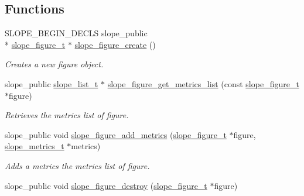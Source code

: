 \subsection*{Functions}
\begin{DoxyCompactItemize}
\item 
S\+L\+O\+P\+E\+\_\+\+B\+E\+G\+I\+N\+\_\+\+D\+E\+C\+L\+S slope\+\_\+public \\*
\hyperlink{group__Figure_ga507cc82eeca8255d6c0f603ffdaeb59e}{slope\+\_\+figure\+\_\+t} $\ast$ \hyperlink{group__Figure_ga0534b5fef88fda65fd4b8feb33071cab}{slope\+\_\+figure\+\_\+create} ()
\begin{DoxyCompactList}\small\item\em Creates a new figure object. \end{DoxyCompactList}\item 
slope\+\_\+public \hyperlink{group__List_ga88326d377deca937191acac6784bff0e}{slope\+\_\+list\+\_\+t} $\ast$ \hyperlink{group__Figure_gac7d6aaca4df6806f00f3cb130a78dcde}{slope\+\_\+figure\+\_\+get\+\_\+metrics\+\_\+list} (const \hyperlink{group__Figure_ga507cc82eeca8255d6c0f603ffdaeb59e}{slope\+\_\+figure\+\_\+t} $\ast$figure)
\begin{DoxyCompactList}\small\item\em Retrieves the metrics list of figure. \end{DoxyCompactList}\item 
\hypertarget{group__Figure_ga08b6896169ef4a926e7d487ade3fe74e}{slope\+\_\+public void \hyperlink{group__Figure_ga08b6896169ef4a926e7d487ade3fe74e}{slope\+\_\+figure\+\_\+add\+\_\+metrics} (\hyperlink{group__Figure_ga507cc82eeca8255d6c0f603ffdaeb59e}{slope\+\_\+figure\+\_\+t} $\ast$figure, \hyperlink{group__Metrics_gab80787ee8ae8dc449e770249fe0e3c35}{slope\+\_\+metrics\+\_\+t} $\ast$metrics)}\label{group__Figure_ga08b6896169ef4a926e7d487ade3fe74e}

\begin{DoxyCompactList}\small\item\em Adds a metrics the metrics list of figure. \end{DoxyCompactList}\item 
\hypertarget{group__Figure_gada369b301fabc0c40ef172e22d4fcb85}{slope\+\_\+public void \hyperlink{group__Figure_gada369b301fabc0c40ef172e22d4fcb85}{slope\+\_\+figure\+\_\+destroy} (\hyperlink{group__Figure_ga507cc82eeca8255d6c0f603ffdaeb59e}{slope\+\_\+figure\+\_\+t} $\ast$figure)}\label{group__Figure_gada369b301fabc0c40ef172e22d4fcb85}


\end{DoxyCompactItemize}
